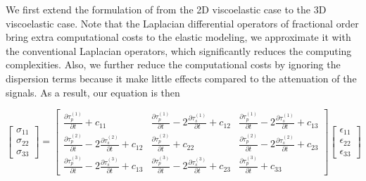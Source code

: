 \documentclass{paris17}
\begin{document}
We first extend the formulation of \cite[]{zhu2014theory} from the 2D viscoelastic case to the 3D viscoelastic case. Note that the Laplacian differential operators of fractional order bring extra computational costs to the elastic modeling, we approximate it with the conventional Laplacian operators, which significantly reduces the computing complexities. Also, we further reduce the computational costs by ignoring the dispersion terms because it make little effects compared to the attenuation of the signals. As a result, our equation is then

\begin{equation}
\begin{bmatrix} \sigma_{11}\\ \sigma_{22}\\ \sigma_{33} \end{bmatrix} = \begin{bmatrix} \frac{\partial \tau_p^{(1)}}{\partial t} + c_{11} & \frac{\partial \tau_p^{(1)}}{\partial t} - 2\frac{\partial \tau_s^{(1)}}{\partial t} +c_{12}& \frac{\partial \tau_p^{(1)}}{\partial t} - 2\frac{\partial \tau_s^{(1)}}{\partial t} +c_{13} \\ \frac{\partial \tau_p^{(2)}}{\partial t} - 2\frac{\partial \tau_s^{(2)}}{\partial t} +c_{12}& \frac{\partial \tau_p^{(2)}}{\partial t} + c_{22} & \frac{\partial \tau_p^{(2)}}{\partial t} - 2\frac{\partial \tau_s^{(2)}}{\partial t} +c_{23}\\ \frac{\partial \tau_p^{(3)}}{\partial t} - 2\frac{\partial \tau_s^{(3)}}{\partial t} +c_{13} & \frac{\partial \tau_p^{(3)}}{\partial t} - 2\frac{\partial \tau_s^{(3)}}{\partial t} +c_{23} & \frac{\partial \tau_p^{(3)}}{\partial t} + c_{33} \end{bmatrix} \begin{bmatrix} \epsilon_{11}\\ \epsilon_{22}\\ \epsilon_{33} \end{bmatrix}
\end{equation}
\end{document}
